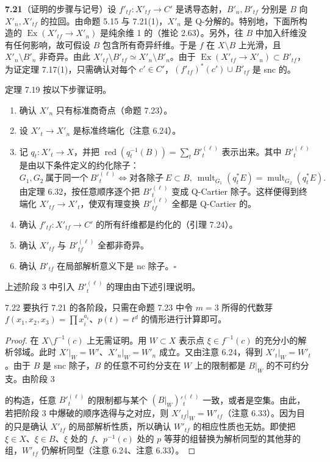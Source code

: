 \par\medskip\noindent\textbf{7.21}（证明的步骤与记号）\quad 设 $f'_{tf}\colon X'_{tf}\to C'$ 是诱导态射，$B'_n,B'_{tf}$ 分别是 $B$ 向 $X'_n,X'_{tf}$ 的拉回。由命题 5.15 与 7.21(1)，$X'_n$ 是 Q-分解的。特别地，下面所构造的 $\operatorname{Ex}(X'_{tf}\to X'_n)$ 是纯余维 1 的（推论 2.63）。另外，往 $B$ 中加入纤维没有任何影响，故可假设 $B$ 包含所有奇异纤维。于是 $f$ 在 $X\setminus B$ 上光滑，且 $X'_n\setminus B'_n$ 非奇异。由此 $X'_{tf}\setminus B'_{tf}\simeq X'_n\setminus B'_n$。由于 $\operatorname{Ex}(X'_{tf}\to X'_n)\subset B'_{tf}$，为证定理 7.17(1)，只需确认对每个 $c'\in C'$，$(f'_{tf})^*(c')\cup B'_{tf}$ 是 snc 的。

定理 7.19 按以下步骤证明。
\begin{enumerate}[label=(\arabic*),leftmargin=2.4em,itemsep=1pt,topsep=2pt,parsep=0pt]
\item 确认 $X'_n$ 只有标准商奇点（命题 7.23）。
\item 设 $X'_t\to X'_n$ 是标准终端化（注意 6.24）。
\item 记 $q_t\colon X'_t\to X$，并把 $\operatorname{red}(q_t^{-1}(B))=\sum_t B'^{(\ell)}_t$ 表示出来。其中 $B'^{(\ell)}_t$ 是由以下条件定义的约化除子：
\[
G_1,G_2\ \text{属于同一个}\ B'^{(\ell)}_t
\iff
\text{对各除子}\ E\subset B,\ \operatorname{mult}_{G_1}(q_t^*E)=\operatorname{mult}_{G_2}(q_t^*E).
\]
由定理 6.32，按任意顺序逐个把 $B'^{(\ell)}_t$ 变成 Q-Cartier 除子。这样便得到终端化 $X'_{tf}\to X'_t$，使双有理变换 $B'^{(\ell)}_{tf}$ 全都是 Q-Cartier 的。
\item 确认 $f'_{tf}\colon X'_{tf}\to C'$ 的所有纤维都是约化的（引理 7.24）。
\item 确认 $X'_{tf}$ 与 $B'^{(\ell)}_{tf}$ 全都非奇异。
\item 确认 $B'_{tf}$ 在局部解析意义下是 nc 除子。\hfill$\square$
\end{enumerate}

上述阶段 3 中引入 $B'^{(\ell)}_t$ 的理由由下述引理说明。

\begin{lemmap}{7.22}
要执行 7.21 的各阶段，只需在命题 7.23 中令 $m=3$ 所得的代数芽 $f(x_1,x_2,x_3)=\prod x_i^{a_i}$、$p(t)=t^d$ 的情形进行计算即可。
\end{lemmap}

\begin{proof}
在 $X\setminus f^{-1}(c)$ 上无需证明。用 $W\subset X$ 表示点 $\xi\in f^{-1}(c)$ 的充分小的解析邻域。此时 $X'|_W=W'$、$X'_n|_W=W'_n$ 成立。又由注意 6.24，得到 $X'_t|_W=W'_t$。由于 $B$ 是 snc 除子，$B$ 的任意不可约分支在 $W$ 上的限制都是 $B|_W$ 的不可约分支。由阶段 3

的构造，任意 $B'^{(\ell)}_t$ 的限制都与某个 $(B|_W)'^{(\ell)}_t$ 一致，或者是空集。由此，若把阶段 3 中爆破的顺序选得与之对应，则 $X'_{tf}|_W=W'_{tf}$（注意 6.33）。因为目的只是确认 $X'_{tf}$ 的局部解析性质，所以确认 $W'_{tf}$ 的相应性质也无妨。即使把 $\xi\in X$、$\xi\in B$、$\xi$ 处的 $f$、$p^{-1}(c)$ 处的 $p$ 等芽的组替换为解析同型的其他芽的组，$W'_{tf}$ 仍解析同型（注意 6.24、注意 6.33）。
\end{proof}

